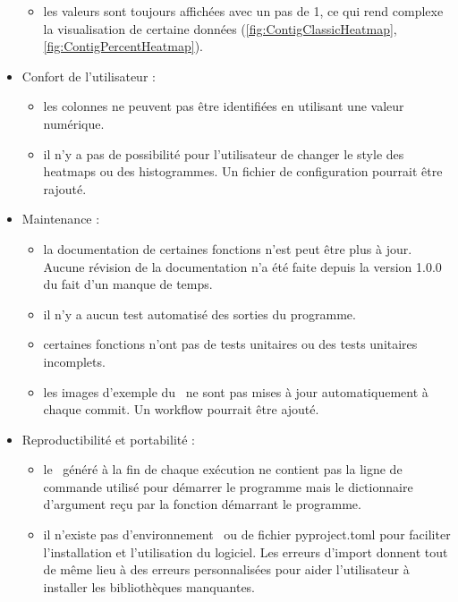\documentclass[../main]{subfiles} %
\begin{document}
\begin{itemize}
\begin{itemize}
            \item les valeurs sont toujours affichées avec un pas de 1, ce qui rend complexe la visualisation de certaine données (\cref{fig:ContigClassicHeatmap}, \cref{fig:ContigPercentHeatmap}).
        \end{itemize}

    \item Confort de l'utilisateur :
    \begin{itemize}
        \item les colonnes ne peuvent pas être identifiées en utilisant une valeur numérique.
        
        \item il n'y a pas de possibilité pour l'utilisateur de changer le style des heatmaps ou des histogrammes. Un fichier de configuration pourrait être rajouté.
        
    \end{itemize}

    \item Maintenance :
        \begin{itemize}
          \item la documentation de certaines fonctions n'est peut être plus à jour. Aucune révision de la documentation n'a été faite depuis la version 1.0.0 du fait d'un manque de temps.
    
        \item il n'y a aucun test automatisé des sorties du programme. 
        
        \item certaines fonctions n'ont pas de tests unitaires ou des tests unitaires incomplets.

        \item les images d'exemple du \readme ne sont pas mises à jour automatiquement à chaque \gls{commit}. Un workflow pourrait être ajouté.

        
    \end{itemize}

\item Reproductibilité et portabilité : 
\begin{itemize}
     \item le \readme généré à la fin de chaque exécution ne contient pas la ligne de commande utilisé pour démarrer le programme mais le dictionnaire d'argument reçu par la fonction démarrant le programme.

     \item il n'existe pas d'environnement \Conda ou de fichier \gls{pyproject.toml} pour faciliter l'installation et l'utilisation du logiciel. Les erreurs d'import donnent tout de même lieu à des erreurs personnalisées pour aider l'utilisateur à installer les bibliothèques manquantes.
    \end{itemize}
\end{itemize}
\end{document}
